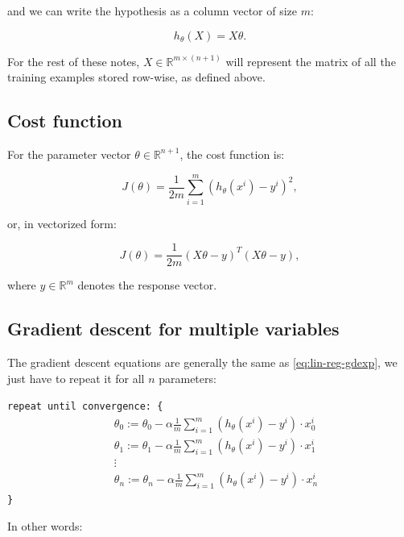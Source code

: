 \documentclass[a4paper,11pt]{report}
\newcommand{\ds}{\displaystyle}
\begin{document}
and we can write the hypothesis as a column vector of size $m$:

\begin{equation}\label{eq:mul-reg-hyp-mat}
h_\theta(X) = X \theta .
\end{equation}

For the rest of these notes, $X\in\mathbb{R}^{m\times(n+1)}$ will represent the matrix of all the training examples stored row-wise, as defined above.

\subsection*{Cost function}

For the parameter vector $\theta\in \mathbb{R}^{n+1}$, the cost function is:

\begin{equation}\label{eq:mul-reg-cost}
J(\theta) = \ds\frac{1}{2m}\sum_{i=1}^{m}{(h_\theta(x^i)- y^i)^2},
\end{equation}

or, in vectorized form:

\begin{equation}\label{eq:mul-reg-cost-vec}
J(\theta) = \dfrac{1}{2m}(X\theta - {y})^T(X\theta - {y}),
\end{equation}

where $y\in \mathbb{R}^m$ denotes the response vector.


\subsection*{Gradient descent for multiple variables}

The gradient descent equations are generally the same as \eqref{eq:lin-reg-gdexp}, we just have to repeat it for all $n$ parameters:

\verb"repeat until convergence: {"
\begin{align*}
\; & \theta_0 := \theta_0 - \alpha \frac{1}{m} \sum\limits_{i=1}^{m} (h_\theta(x^{i}) - y^{i}) \cdot x_0^{i}\\
\; & \theta_1 := \theta_1 - \alpha \frac{1}{m} \sum\limits_{i=1}^{m} (h_\theta(x^{i}) - y^{i}) \cdot x_1^{i} \\
& \vdots \\
\; & \theta_n := \theta_n - \alpha \frac{1}{m} \sum\limits_{i=1}^{m} (h_\theta(x^{i}) - y^{i}) \cdot x_n^{i}
\end{align*}
\verb"}"

In other words:
\end{document}
